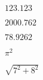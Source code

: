\begin{bbwAufgabenBlock}
\item $123.123$ 
\item $2000.762$ 
\item $78.9262$ 
\item $\pi^2$ 
\item $\sqrt{7^2+8^2}$ 
\end{bbwAufgabenBlock}

\platzFuerBerechnungenBisEndeSeite{}
\TRAINER{\newpage}




